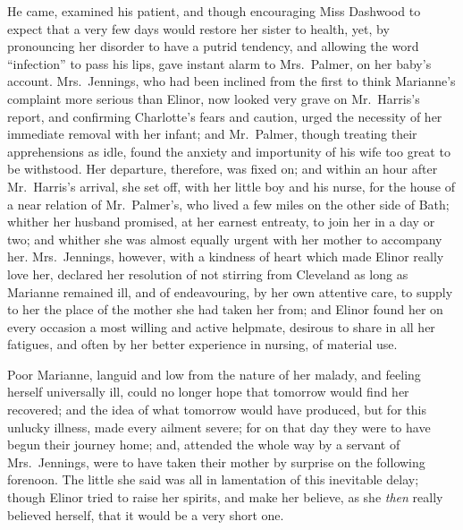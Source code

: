 \documentclass{article}
\begin{document}
He came, examined his patient, and though encouraging
Miss Dashwood to expect that a very few days would restore
her sister to health, yet, by pronouncing her disorder
to have a putrid tendency, and allowing the word ``infection''
to pass his lips, gave instant alarm to Mrs.\ Palmer,
on her baby's account.  Mrs.\ Jennings, who had been inclined
from the first to think Marianne's complaint more serious
than Elinor, now looked very grave on Mr.\ Harris's report,
and confirming Charlotte's fears and caution, urged the
necessity of her immediate removal with her infant;
and Mr.\ Palmer, though treating their apprehensions as idle,
found the anxiety and importunity of his wife too great
to be withstood.  Her departure, therefore, was fixed on;
and within an hour after Mr.\ Harris's arrival, she set off,
with her little boy and his nurse, for the house of a
near relation of Mr.\ Palmer's, who lived a few miles
on the other side of Bath; whither her husband promised,
at her earnest entreaty, to join her in a day or two;
and whither she was almost equally urgent with her
mother to accompany her.  Mrs.\ Jennings, however, with a
kindness of heart which made Elinor really love her,
declared her resolution of not stirring from Cleveland
as long as Marianne remained ill, and of endeavouring,
by her own attentive care, to supply to her the place
of the mother she had taken her from; and Elinor found her
on every occasion a most willing and active helpmate,
desirous to share in all her fatigues, and often by her
better experience in nursing, of material use.

Poor Marianne, languid and low from the nature
of her malady, and feeling herself universally ill,
could no longer hope that tomorrow would find her recovered;
and the idea of what tomorrow would have produced,
but for this unlucky illness, made every ailment severe;
for on that day they were to have begun their journey home;
and, attended the whole way by a servant of Mrs.\ Jennings,
were to have taken their mother by surprise on the
following forenoon.  The little she said was all in
lamentation of this inevitable delay; though Elinor tried
to raise her spirits, and make her believe, as she \emph{then}
really believed herself, that it would be a very short one.
\end{document}
